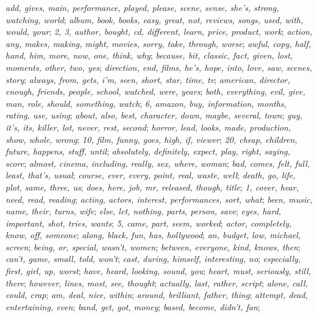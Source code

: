 \begingroup\small\raggedright\sloppy
\textit{add, gives, main, performance, played, please, scene, sense, she's, strong, watching, world};
\textit{album, book, books, easy, great, not, reviews, songs, used, with, would, your};
\textit{2, 3, author, bought, cd, different, learn, price, product, work};
\textit{action, any, makes, making, might, movies, sorry, take, through, worse};
\textit{awful, copy, half, hand, him, more, now, one, think, why};
\textit{because, bit, classic, fact, given, lost, moments, other, two, yes};
\textit{direction, end, films, he's, hope, into, love, saw, scenes, story};
\textit{always, from, gets, i'm, seen, short, star, time, tv};
\textit{american, director, enough, friends, people, school, watched, were, years};
\textit{both, everything, evil, give, man, role, should, something, watch};
\textit{6, amazon, buy, information, months, rating, use, using};
\textit{about, also, best, character, down, maybe, several, town};
\textit{guy, it's, its, killer, lot, never, rest, second};
\textit{horror, lead, looks, made, production, show, whole, wrong};
\textit{10, film, funny, goes, high, if, viewer};
\textit{20, cheap, children, future, happens, stuff, until};
\textit{absolutely, definitely, expect, play, right, saying, score};
\textit{almost, cinema, including, really, sex, where, woman};
\textit{bad, comes, felt, full, least, that's, usual};
\textit{course, ever, every, point, real, waste, well};
\textit{death, go, life, plot, same, three, us};
\textit{does, here, job, mr, released, though, title};
\textit{1, cover, hear, need, read, reading};
\textit{acting, actors, interest, performances, sort, what};
\textit{been, music, name, their, turns, wife};
\textit{else, let, nothing, parts, person, save};
\textit{eyes, hard, important, shot, tries, wants};
\textit{5, came, part, seem, worked};
\textit{actor, completely, know, off, someone};
\textit{along, black, fun, has, hollywood};
\textit{an, budget, low, michael, screen};
\textit{being, or, special, wasn't, women};
\textit{between, everyone, kind, knows, then};
\textit{can't, game, small, told, won't};
\textit{cast, during, himself, interesting, no};
\textit{especially, first, girl, up, worst};
\textit{have, heard, looking, sound, you};
\textit{heart, must, seriously, still, there};
\textit{however, lines, most, see, thought};
\textit{actually, last, rather, script};
\textit{alone, call, could, crap};
\textit{am, deal, nice, within};
\textit{around, brilliant, father, thing};
\textit{attempt, dead, entertaining, even};
\textit{band, get, got, money};
\textit{based, become, didn't, fan};
